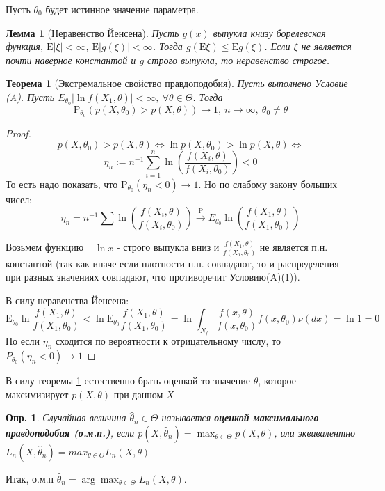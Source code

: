 \documentclass[12pt]{article}
\newtheorem{definition}{Опр.}
\newtheorem{lemma}{Лемма}
\theoremstyle{basic_theorem}
\newtheorem{theorem}{Теорема}
\theoremstyle{name_theorem}
\newcommand\defin[1]{\textbf{#1}}
\def\E{
    \mathrm{E}
}
\def\P{
    \mathrm{P}
}
\begin{document}
    Пусть $\theta_0$ будет истинное значение параметра.
    \begin{lemma}[Неравенство Йенсена]
        Пусть $g(x)$ выпукла книзу борелевская функция, $\E|\xi| <\infty$,
        $\E|g(\xi)| <\infty$. Тогда $g(\E\xi) \leq \E g(\xi)$. Если $\xi$
        не является почти наверное константой и $g$ строго выпукла, то неравенство строгое.
    \end{lemma}
    \begin{theorem}[Экстремальное свойство правдоподобия]
        \label{th::extr_plausibility}
        Пусть выполнено Условие (A). Пусть $E_{\theta_0} |\ln f(X_1, \theta)| < \infty,\ \forall \theta \in \Theta$.
        Тогда 
        $$\P_{\theta_0}(p(X, \theta_0) > p(X, \theta)) \rightarrow 1,\ n\rightarrow \infty,\ \theta_0 \neq \theta$$
    \end{theorem}
    \begin{proof}
        $$p(X, \theta_0) > p(X, \theta) \Leftrightarrow \ln p(X, \theta_0) > \ln p(X, \theta) \Leftrightarrow$$
        $$\eta_n := n^{-1} \sum_{i=1}^n \ln \left(\frac{f(X_i, \theta)}{f(X_i, \theta_0)}\right) < 0$$
    То есть надо показать, что $\P_{\theta_0}(\eta_n < 0) \rightarrow 1$. Но по слабому закону больших чисел:
    $$\eta_n = n^{-1}\sum \ln \left(\frac{f(X_i, \theta)}{f(X_i, \theta_0)} \right) \xrightarrow{\P}
    E_{\theta_0}\ln \left(\frac{f(X_1, \theta)}{f(X_1, \theta_0)} \right) $$

    Возьмем функцию $-\ln x$ - строго выпукла вниз и $\frac{f(X_1, \theta)}{f(X_1, \theta_0)}$
    не является п.н. константой (так как иначе если плотности п.н. совпадают,
    то и распределения при разных значениях совпадают, что противоречит Условию(A)(1)). 

    В силу неравенства Йенсена:
    $$\E_{\theta_0} \ln \frac{f(X_1, \theta)}{f(X_1, \theta_0)} < \ln \E_{\theta_0} \frac{f(X_1, \theta)}{f(X_1, \theta_0)} = \ln \int_{N_f} \frac{f(x, \theta)}{f(x, \theta_0)} f(x, \theta_0) \nu(dx) = \ln1 = 0$$
    Но если $\eta_n$ сходится по вероятности к отрицательному числу, то $P_{\theta_0}(\eta_n < 0) \rightarrow 1$
\end{proof}
    В силу теоремы \ref{th::extr_plausibility} естественно брать
    оценкой то значение $\theta$, которое максимизирует $p(X, \theta)$ при данном $X$

    \begin{definition}
        Случайная величина $\hat{\theta}_n \in \Theta$ называется
        \defin{оценкой максимального правдоподобия (о.м.п.)}, если
        $p(X, \hat{\theta}_n) = \max_{\theta\in\Theta} p(X, \theta)$,
        или эквивалентно $L_n(X, \hat{\theta}_n) = max_{\theta\in\Theta} L_n(X, \theta)$
    \end{definition}
    Итак, о.м.п $\hat{\theta}_n = \arg\max_{\theta\in\Theta} L_n(X, \theta)$.
    
\end{document}
